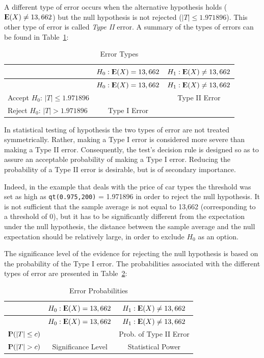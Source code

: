 \documentclass[]{krantz}
\newcommand{\Expec}{{\rm I\kern-.3em E}}
\newcommand{\Prob}{{\rm I\kern-.3em P}}
\theoremstyle{definition}
\theoremstyle{definition}
\theoremstyle{definition}
\theoremstyle{remark}
\begin{document}
A different type of error occurs when the alternative hypothesis holds
(\(\Expec(X) \not= 13,662\)) but the null hypothesis is not rejected
(\(|T| \leq 1.971896\)). This other type of error is called \emph{Type II}
error. A summary of the types of errors can be found in
Table~\ref{tab:Testing1}:

\begin{longtable}[]{@{}lcc@{}}
\caption{\label{tab:Testing1}Error Types{}}\tabularnewline
\toprule
& \(H_0: \Expec(X) = 13,662\) & \(H_1:\Expec(X) \not= 13,662\)\tabularnewline
\midrule
\endfirsthead
\toprule
& \(H_0: \Expec(X) = 13,662\) & \(H_1:\Expec(X) \not= 13,662\)\tabularnewline
\midrule
\endhead
Accept \(H_0\): \(|T| \leq 1.971896\) & & Type II Error\tabularnewline
Reject \(H_0\): \(|T| > 1.971896\) & Type I Error &\tabularnewline
\bottomrule
\end{longtable}

In statistical testing of hypothesis the two types of error are not
treated symmetrically. Rather, making a Type I error is considered more
severe than making a Type II error. Consequently, the test's decision
rule is designed so as to assure an acceptable probability of making a
Type I error. Reducing the probability of a Type II error is desirable,
but is of secondary importance.

Indeed, in the example that deals with the price of car types the
threshold was set as high as \texttt{qt(0.975,200)} = 1.971896 in order to
reject the null hypothesis. It is not sufficient that the sample average
is not equal to 13,662 (corresponding to a threshold of 0), but it has
to be significantly different from the expectation under the null
hypothesis, the distance between the sample average and the null
expectation should be relatively large, in order to exclude \(H_0\) as an
option.

The significance level of the evidence for rejecting the null hypothesis
is based on the probability of the Type I error. The probabilities
associated with the different types of error are presented in
Table~\ref{tab:Testing2}:

\begin{longtable}[]{@{}lcc@{}}
\caption{\label{tab:Testing2}Error Probabilities{}}\tabularnewline
\toprule
& \(H_0: \Expec(X) = 13,662\) & \(H_1:\Expec(X) \not= 13,662\)\tabularnewline
\midrule
\endfirsthead
\toprule
& \(H_0: \Expec(X) = 13,662\) & \(H_1:\Expec(X) \not= 13,662\)\tabularnewline
\midrule
\endhead
\(\Prob(|T| \leq c)\) & & Prob. of Type II Error\tabularnewline
\(\Prob(|T| > c)\) & Significance Level & Statistical Power\tabularnewline
\bottomrule
\end{longtable}
\end{document}
